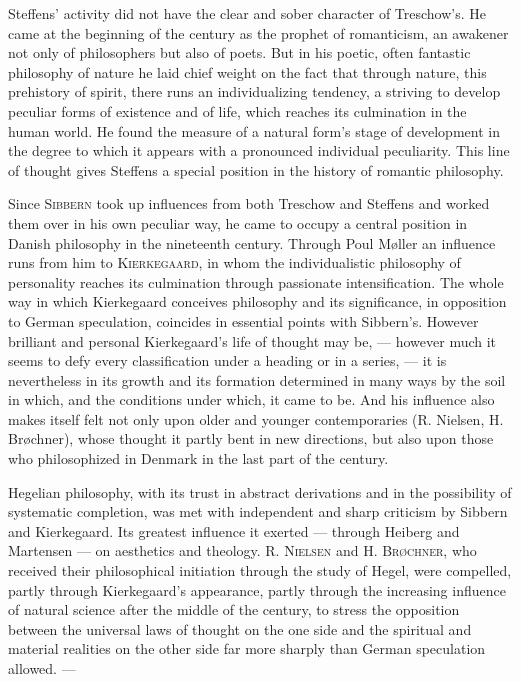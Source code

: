\documentclass[12pt,a4paper,openany]{book}
\newcommand{\opage}[1]{\marginnote{\footnotesize\textit{[#1]}}}
\newenvironment{intro}{\par}{\par}
\begin{document}
\begin{intro}
Steffens' activity did not have the clear and sober character of Treschow's. He
came at the beginning of the century as the prophet of romanticism, an awakener
not only of philosophers but also of poets. But in his poetic, often fantastic
philosophy of nature he laid chief weight on the fact that through nature, this
prehistory of spirit, there runs an individualizing tendency, a striving to
develop peculiar forms of existence and of life, which reaches its culmination in
the human world. He found the measure of a natural form's stage of development
in the degree to which it appears with a pronounced individual peculiarity. This
line of thought gives Steffens a special position in the history of romantic
philosophy.

Since \textsc{Sibbern} took up influences from both Treschow and Steffens and
worked them over in his own peculiar way, he came to occupy a central position
in Danish philosophy in the nineteenth century. Through Poul Møller an
influence runs from him to \textsc{Kierkegaard}, in whom the individualistic
philosophy of personality reaches its culmination through passionate
intensification. The whole way in which Kierkegaard conceives philosophy and
its significance, in opposition to German speculation, coincides in essential
points with Sibbern's. However brilliant and personal Kierkegaard's life of
thought may be, --- however much it seems to defy every classification under a
heading or in a series, --- it is nevertheless in its growth and its formation
determined in many ways by the soil in which, and the conditions under which,
it came to be. And his influence also makes itself felt not only upon older
and younger contemporaries (R. Nielsen, H. Brøchner), whose thought it partly
bent in new directions, but also upon those who philosophized in Denmark in the
last part of the century.

\setcounter{footnote}{0}%
\opage{3}Hegelian philosophy, with its trust in abstract derivations and in the
possibility of systematic completion, was met with independent and sharp
criticism by Sibbern and Kierkegaard. Its greatest influence it exerted --- through
Heiberg and Martensen --- on aesthetics and theology. R. \textsc{Nielsen} and
H. \textsc{Brøchner}, who received their philosophical initiation through the
study of Hegel, were compelled, partly through Kierkegaard's appearance, partly
through the increasing influence of natural science after the middle of the
century, to stress the opposition between the universal laws of thought on the
one side and the spiritual and material realities on the other side far more
sharply than German speculation allowed. ---


\end{intro}
\end{document}
